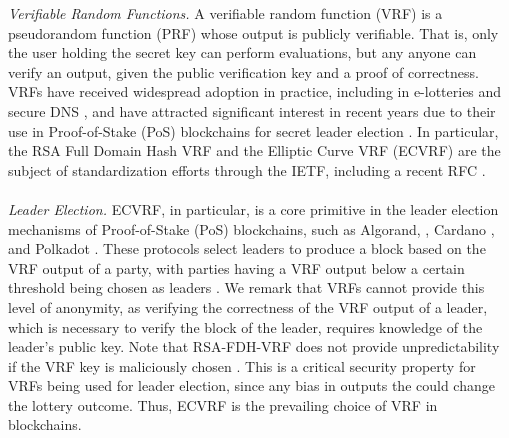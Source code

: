 \emph{Verifiable Random Functions.}
A verifiable random function (VRF) \cite{vrf_micali} is a pseudorandom function (PRF) whose output is publicly verifiable.
That is, only the user holding the secret key can perform evaluations, but any anyone can
verify an output, given the public verification key and a proof of correctness.
VRFs have received widespread adoption in practice, including in e-lotteries \cite{MicaliR02,LiangBM20} and secure DNS \cite{GoldbergNPRVZ15,PapadopoulosWHNVRG17}, and have attracted significant interest in recent years due to their use in Proof-of-Stake (PoS) blockchains for secret leader election \cite{ChenM19,KiayiasRDO17,DavidGKR17,BurdgesASV23a}.
In particular, the RSA Full Domain Hash VRF and the Elliptic Curve VRF (ECVRF) are the subject of standardization efforts through the IETF, including a recent RFC \cite{VRF-RFC}.
\\\\
\noindent \emph{Leader Election.}  ECVRF, in particular, is a core primitive in the leader election mechanisms of Proof-of-Stake (PoS) blockchains, such as Algorand, \cite{ChenM19}, Cardano \cite{KiayiasRDO17,DavidGKR17}, and Polkadot \cite{BurdgesASV23a}.
These protocols select leaders to produce a block  based on the VRF output of a party, with parties having a VRF output below a certain threshold being chosen as leaders \cite{praos,genesis}. 
 We remark that VRFs cannot provide this level of anonymity, as verifying the correctness of the VRF output of a leader, which is necessary to verify the block of the leader, requires knowledge of the leader's public key.
Note that RSA-FDH-VRF does not provide unpredictability if the VRF key is maliciously chosen \cite{VRF-RFC}. This is a critical security property for VRFs being used for leader election, since any bias in outputs the could change the lottery outcome.  Thus, ECVRF is the prevailing choice of VRF in blockchains.
\\\\
